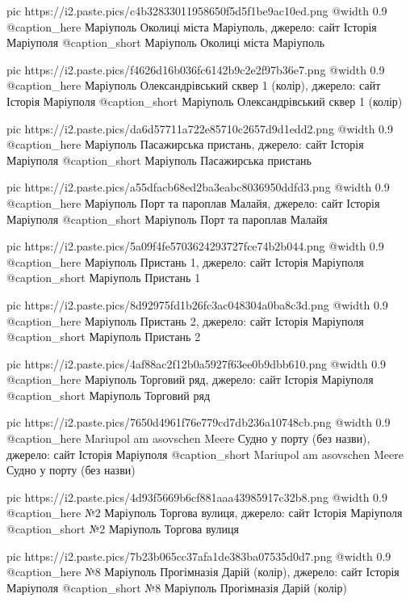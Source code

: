   pic https://i2.paste.pics/c4b32833011958650f5d5f1be9ac10ed.png
  @width 0.9
  @caption_here Маріуполь Околиці міста Маріуполь, джерело: сайт Історія Маріуполя
  @caption_short Маріуполь Околиці міста Маріуполь

  pic https://i2.paste.pics/f4626d16b036fc6142b9c2e2f97b36e7.png
  @width 0.9
  @caption_here Маріуполь Олександрівський сквер 1 (колір), джерело: сайт Історія Маріуполя
  @caption_short Маріуполь Олександрівський сквер 1 (колір)

  pic https://i2.paste.pics/da6d57711a722e85710c2657d9d1edd2.png
  @width 0.9
  @caption_here Маріуполь Пасажирська пристань, джерело: сайт Історія Маріуполя
  @caption_short Маріуполь Пасажирська пристань

  pic https://i2.paste.pics/a55dfacb68ed2ba3eabc8036950ddfd3.png
  @width 0.9
  @caption_here Маріуполь Порт та пароплав Малайя, джерело: сайт Історія Маріуполя
  @caption_short Маріуполь Порт та пароплав Малайя

  pic https://i2.paste.pics/5a09f4fe5703624293727fce74b2b044.png
  @width 0.9
  @caption_here Маріуполь Пристань 1, джерело: сайт Історія Маріуполя
  @caption_short Маріуполь Пристань 1

  pic https://i2.paste.pics/8d92975fd1b26fc3ac048304a0ba8c3d.png
  @width 0.9
  @caption_here Маріуполь Пристань 2, джерело: сайт Історія Маріуполя
  @caption_short Маріуполь Пристань 2

  pic https://i2.paste.pics/4af88ac2f12b0a5927f63ee0b9dbb610.png
  @width 0.9
  @caption_here Маріуполь Торговий ряд, джерело: сайт Історія Маріуполя
  @caption_short Маріуполь Торговий ряд

  pic https://i2.paste.pics/7650d4961f76e779cd7db236a10748cb.png
  @width 0.9
  @caption_here Mariupol am asovschen Meere Судно у порту (без назви), джерело: сайт Історія Маріуполя
  @caption_short Mariupol am asovschen Meere Судно у порту (без назви)

  pic https://i2.paste.pics/4d93f5669b6cf881aaa43985917c32b8.png
  @width 0.9
  @caption_here №2 Маріуполь Торгова вулиця, джерело: сайт Історія Маріуполя
  @caption_short №2 Маріуполь Торгова вулиця

  pic https://i2.paste.pics/7b23b065cc37afa1de383ba07535d0d7.png
  @width 0.9
  @caption_here №8 Маріуполь Прогімназія Дарій (колір), джерело: сайт Історія Маріуполя
  @caption_short №8 Маріуполь Прогімназія Дарій (колір)

